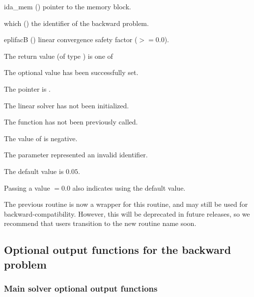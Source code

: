 {
  \begin{args}
  \item[ida\_mem] ()
    pointer to the {\idas} memory block.
  \item[which] ()
    the identifier of the backward problem.
  \item[eplifacB] ()
    linear convergence safety factor ($>= 0.0$).
  \end{args}
}
{
  The return value  (of type ) is one of
  \begin{args}
  \item[\Id{IDALS\_SUCCESS}]
    The optional value has been successfully set.
  \item[\Id{IDALS\_MEM\_NULL}]
    The  pointer is .
  \item[\Id{IDALS\_LMEM\_NULL}]
    The {\idals} linear solver has not been initialized.
  \item[\Id{IDALS\_NO\_ADJ}]
    The function  has not been previously called.
  \item[\Id{IDALS\_ILL\_INPUT}]
    The value of  is negative.
  \item[\Id{IDALS\_ILL\_INPUT}]
    The parameter  represented an invalid identifier.
  \end{args}
}
{
  The default value is $0.05$.

  Passing a value $ = 0.0$ also indicates using the default value.

  The previous routine  is now a
  wrapper for this routine, and may still be used for
  backward-compatibility.  However, this will be deprecated in future
  releases, so we recommend that users transition to the new routine
  name soon.
}
\subsection{Optional output functions for the backward problem}
\label{ss:optional_output_b}

\subsubsection{Main solver optional output functions}

